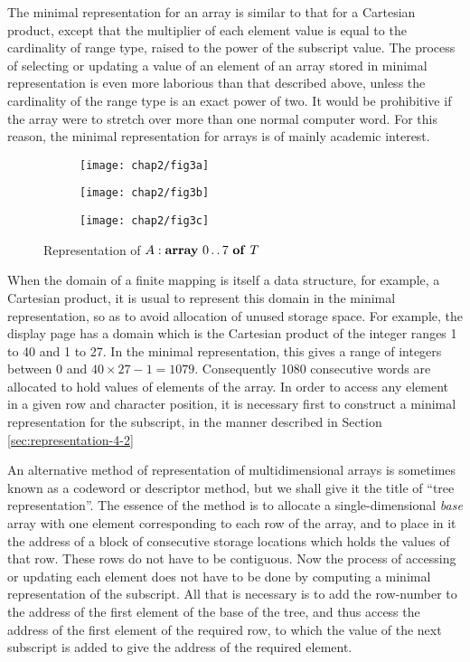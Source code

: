 The minimal representation for an array is similar to that for a Cartesian product, except that the multiplier of each element value is equal to the cardinality of range type, raised to the power of the subscript value. The process of selecting or updating a value of an element of an array stored in minimal representation is even more laborious than that described above, unless the cardinality of the range type is an exact power of two. It would be prohibitive if the array were to stretch over more than one normal computer word. For this reason, the minimal representation for arrays is of mainly academic interest.

\begin{figure}[h]
	\centering
	\begin{subfigure}[b]{0.3\textwidth}
		\centering
		\texttt{[image: chap2/fig3a]}
		\caption{}
	\end{subfigure}	
	\begin{subfigure}[b]{0.3\textwidth}
		\centering
		\texttt{[image: chap2/fig3b]}
		\caption{}
	\end{subfigure}	
	\begin{subfigure}[b]{0.3\textwidth}
		\centering
		\texttt{[image: chap2/fig3c]}
		\caption{}
	\end{subfigure}%
	\caption{Representation of $A:\text{\textbf{array} } 0\,.\,.\,7 \text{ \textbf{of} } T$}
\end{figure}

When the domain of a finite mapping is itself a data structure, for example, a Cartesian product, it is usual to represent this domain in the minimal representation, so as to avoid allocation of unused storage space. For example, the display page has a domain which is the Cartesian product of the integer ranges 1 to 40 and 1 to 27. In the minimal representation, this gives a range of integers between 0 and $40 \times 27 - 1 = 1079$. Consequently 1080 consecutive words are allocated to hold values of elements of the array. In order to access any element in a given row and character position, it is necessary first to construct a minimal representation for the subscript, in the manner described in Section \ref{sec:representation-4-2}

An alternative method of representation of multidimensional arrays is sometimes known as a codeword or descriptor method, but we shall give it the title of ``tree representation''. The essence of the method is to allocate a single-dimensional \textit{base} array with one element corresponding to each row of the array, and to place in it the address of a block of consecutive storage locations which holds the values of that row. These rows do not have to be contiguous. Now the process of accessing or updating each element does not have to be done by computing a minimal representation of the subscript. All that is necessary is to add the row-number to the address of the first element of the base of the tree, and thus access the address of the first element of the required row, to which the value of the next subscript is added to give the address of the required element.

